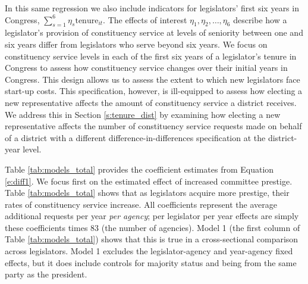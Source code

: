 \documentclass[12pt]{article}
\begin{document}
In this same regression we also include indicators for legislators' first six years in Congress, $ \sum_{s = 1}^{6} \eta_{s} \text{tenure}_{it}$. The effects of interest $\eta_{1}, \eta_{2}, \hdots, \eta_{6}$ describe how a legislator's provision of constituency service at levels of seniority between one and six years differ from legislators who serve beyond six years. We focus on constituency service levels in each of the first six years of a legislator's tenure in Congress to assess how constituency service changes over their initial years in Congress. This design allows us to assess the extent to which new legislators face start-up costs. This specification, however, is ill-equipped to assess how electing a new representative affects the amount of constituency service a district receives. We address this in Section \ref{s:tenure_dist} by examining how electing a new representative affects the number of constituency service requests made on behalf of a district with a different difference-in-differences specification at the district-year level.   




% 

Table \ref{tab:models_total} provides the coefficient estimates from Equation \ref{e:diff1}. We focus first on the estimated effect of increased committee prestige. Table \ref{tab:models_total} shows that as legislators acquire more prestige, their rates of constituency service increase. All coefficients represent the average additional requests per year \textit{per agency}; per legislator per year effects are simply these coefficients times 83 (the number of agencies).
Model 1 (the first column of Table \ref{tab:models_total}) shows that this is true in a cross-sectional comparison across legislators. Model 1 excludes the legislator-agency and year-agency fixed effects, but it does include controls for majority status and being from the same party as the president. 
\end{document}
